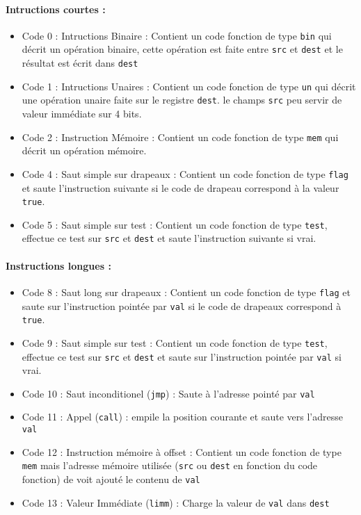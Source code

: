 \documentclass[12pt]{article}
\begin{document}
\paragraph{Intructions courtes :}
\begin{itemize}
\item Code 0 : Intructions Binaire : Contient un code fonction de type
  \verb!bin! qui décrit un opération binaire, cette opération est faite entre
  \verb!src! et \verb!dest! et le résultat est écrit dans \verb!dest!
\item Code 1 : Intructions Unaires : Contient un code fonction de type \verb!un!
  qui décrit une opération unaire faite sur le registre \verb!dest!. le champs \verb!src!
  peu servir de valeur immédiate sur 4 bits.
\item Code 2 : Instruction Mémoire : Contient un code fonction de type
  \verb!mem! qui décrit un opération mémoire.
\item Code 4 : Saut simple sur drapeaux  : Contient un code fonction de type \verb!flag!
  et saute l'instruction suivante si le code de drapeau correspond à la valeur
  \verb!true!.
\item Code 5 : Saut simple sur test : Contient un code fonction de type
  \verb!test!, effectue ce test sur \verb!src! et \verb!dest! et saute
  l'instruction suivante si vrai.
\end{itemize}

\paragraph{Instructions longues :}
\begin{itemize}
\item Code 8 : Saut long sur drapeaux : Contient un code fonction de type \verb!flag!
  et saute sur l'instruction pointée par \verb!val! si le code de drapeaux
  correspond à \verb!true!.
\item Code 9 : Saut simple sur test : Contient un code fonction de type
  \verb!test!, effectue ce test sur \verb!src! et \verb!dest! et saute
  sur l'instruction pointée par \verb!val! si vrai.
\item Code 10 : Saut inconditionel (\verb!jmp!) : Saute à l'adresse pointé par \verb!val!
\item Code 11 : Appel (\verb!call!) : empile la position courante et saute vers l'adresse
  \verb!val!
\item Code 12 : Instruction mémoire à offset : Contient un code fonction de type
  \verb!mem! mais l'adresse mémoire utilisée (\verb!src! ou \verb!dest! en
  fonction du code fonction) de voit ajouté le contenu de \verb!val!
\item Code 13 : Valeur Immédiate (\verb!limm!) : Charge la valeur de \verb!val! dans \verb!dest! 
\end{itemize}
\end{document}
